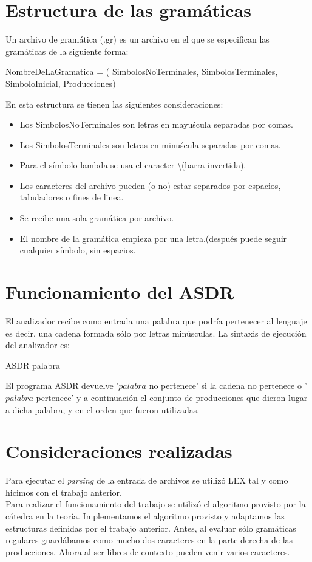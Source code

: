 \documentclass{article}
\begin{document}
\section{Estructura de las gram\'aticas}
Un archivo de gram\'atica (.gr) es un archivo en el que se especifican las gram\'aticas de la siguiente forma: 
\begin{center}
NombreDeLaGramatica = ( {SimbolosNoTerminales}, {SimbolosTerminales}, SimboloInicial, {Producciones})
\end{center}
En esta estructura se tienen las siguientes consideraciones:
\begin{itemize}
\item Los SimbolosNoTerminales son letras en mayu\'scula separadas por comas.
\item Los SimbolosTerminales son letras en minu\'scula separadas por comas.
\item Para el s\'imbolo lambda se usa el caracter \textbackslash (barra invertida).
\item Los caracteres del archivo pueden (o no) estar separados por espacios, tabuladores o fines de linea.
\item Se recibe una sola gram\'atica por archivo.
\item El nombre de la gram\'atica empieza por una letra.(despu\'es puede seguir cualquier s\'imbolo, sin espacios.
\end{itemize}

\section{Funcionamiento del ASDR}
El analizador recibe como entrada una palabra que podr\'ia pertenecer al lenguaje es decir, una cadena formada s\'olo por letras min\'usculas. La sintaxis de ejecuci\'on del analizador es: 
\begin{center}
ASDR palabra
\end{center}
El programa ASDR devuelve '$palabra$ no pertenece' si la cadena no pertenece o '$palabra$ pertenece' y a continuaci\'on el conjunto de producciones que dieron lugar a dicha palabra, y en el orden que fueron utilizadas.

\section{Consideraciones realizadas}
Para ejecutar el \textit{parsing} de la entrada de archivos se utiliz\'o LEX tal y como hicimos con el trabajo anterior.\\
Para realizar el funcionamiento del trabajo se utiliz\'o el algoritmo provisto por la c\'atedra en la teor\'ia. Implementamos el algoritmo provisto y adaptamos las estructuras definidas por el trabajo anterior. Antes, al evaluar s\'olo gram\'aticas regulares guard\'abamos como mucho dos caracteres en la parte derecha de las producciones. Ahora al ser libres de contexto pueden venir varios caracteres.
\end{document}
